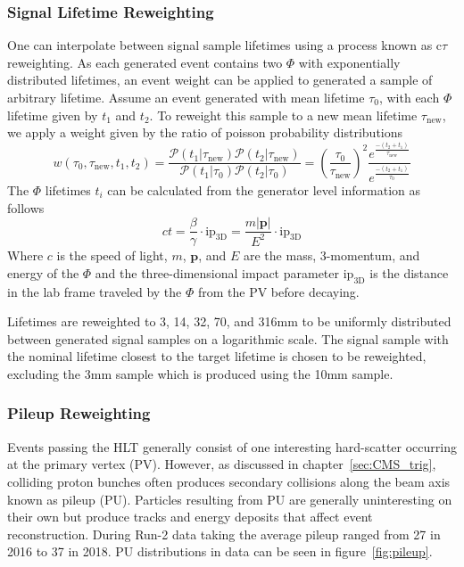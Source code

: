 \subsubsection{Signal Lifetime Reweighting} \label{sec:ana_ctau}
One can interpolate between signal sample lifetimes using a process known as c$\tau$ reweighting. As each generated event contains two $\Phi$ with exponentially distributed lifetimes, an event weight can be applied to generated a sample of arbitrary lifetime. Assume an event generated with mean lifetime $\tau_0$, with each $\Phi$ lifetime given by $t_1$ and $t_2$. To reweight this sample to a new mean lifetime $\tau_\mathrm{new}$, we apply a weight given by the ratio of poisson probability distributions
\begin{equation}\label{eq:ctreweight}
	w(\tau_0, \tau_{\mathrm{new}}, t_1, t_2) =\frac{\mathcal{P}(t_1|\tau_\mathrm{new})\mathcal{P}(t_2|\tau_\mathrm{new})}{\mathcal{P}(t_1|\tau_0)\mathcal{P}(t_2|\tau_0)}= \left(\frac{\tau_0}{\tau_{\mathrm{new}}}\right)^2 \frac{e^{\frac{-(t_2+t_1)}{\tau_{\mathrm{new}}}}}{e^{\frac{-(t_2+t_1)}{\tau_0}}}
\end{equation}
The $\Phi$ lifetimes $t_i$ can be calculated from the generator level information as follows
\begin{equation} \label{eq:lifetime}
	ct=\frac{\beta}{\gamma}\cdot\mathrm{ip}_{\mathrm{3D}}=\frac{m|\mathbf{p}|}{E^2}\cdot\mathrm{ip}_\mathrm{3D}
\end{equation}
Where $c$ is the speed of light, $m$, $\mathbf{p}$, and $E$ are the mass, 3-momentum, and energy of the $\Phi$ and the three-dimensional impact parameter $\mathrm{ip}_\mathrm{3D}$ is the distance in the lab frame traveled by the $\Phi$ from the PV before decaying. 

Lifetimes are reweighted to 3, 14, 32, 70, and 316\unit{mm} to be uniformly distributed between generated signal samples on a logarithmic scale. The signal sample with the nominal lifetime closest to the target lifetime is chosen to be reweighted, excluding the 3\unit{mm} sample which is produced using the 10\unit{mm} sample.

\subsubsection{Pileup Reweighting} \label{sec:ana_pu}
Events passing the HLT generally consist of one interesting hard-scatter occurring at the primary vertex (PV). However, as discussed in chapter~\ref{sec:CMS_trig}, colliding proton bunches often produces secondary collisions along the beam axis known as pileup (PU). Particles resulting from PU are generally uninteresting on their own but produce tracks and energy deposits that affect event reconstruction. During Run-2 data taking the average pileup ranged from 27 in 2016 to 37 in 2018. PU distributions in data can be seen in figure~\ref{fig:pileup}.

